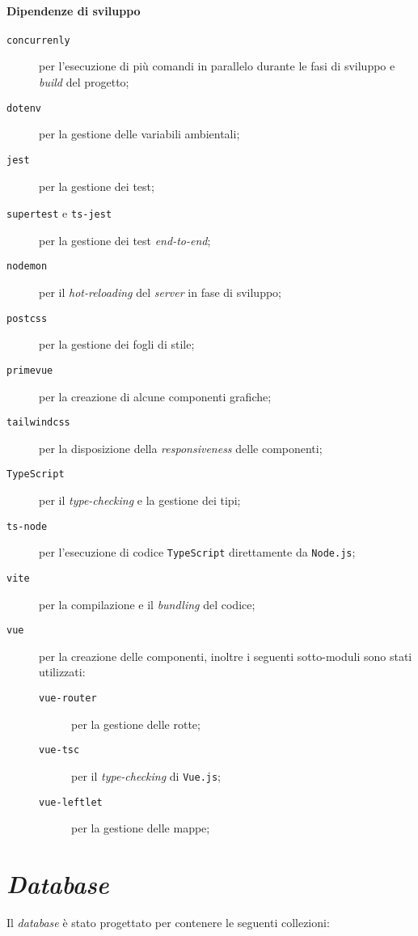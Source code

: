     \paragraph{Dipendenze di sviluppo}
    \begin{description}
        \item[\texttt{concurrenly}] per l'esecuzione di più comandi in parallelo durante le fasi di sviluppo e \textit{build} del progetto;
        \item[\texttt{dotenv}] per la gestione delle variabili ambientali;
        \item[\texttt{jest}] per la gestione dei test;
        \item[\texttt{supertest} e \texttt{ts-jest}] per la gestione dei test \textit{end-to-end};
        \item[\texttt{nodemon}] per il \textit{hot-reloading} del \textit{server} in fase di sviluppo;
        \item[\texttt{postcss}] per la gestione dei fogli di stile;
        \item[\texttt{primevue}] per la creazione di alcune componenti grafiche;
        \item[\texttt{tailwindcss}] per la disposizione della \textit{responsiveness} delle componenti;
        \item[\texttt{TypeScript}] per il \textit{type-checking} e la gestione dei tipi;
        \item[\texttt{ts-node}] per l'esecuzione di codice \texttt{TypeScript} direttamente da \texttt{Node.js};
        \item[\texttt{vite}] per la compilazione e il \textit{bundling} del codice;
        \item[\texttt{vue}] per la creazione delle componenti, inoltre i seguenti sotto-moduli sono stati utilizzati:
            \begin{description}
                \item[\texttt{vue-router}] per la gestione delle rotte;
                \item[\texttt{vue-tsc}] per il \textit{type-checking} di \texttt{Vue.js};
                \item[\texttt{vue-leftlet}] per la gestione delle mappe;
            \end{description}
    \end{description}
\section{\textit{Database}}
    Il \textit{database} è stato progettato per contenere le seguenti collezioni:
